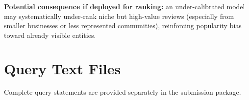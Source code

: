 \documentclass[11pt,a4paper]{article}
\begin{document}
\textbf{Potential consequence if deployed for ranking:} an under-calibrated model may systematically under-rank niche but high-value reviews (especially from smaller businesses or less represented communities), reinforcing popularity bias toward already visible entities.

\section{Query Text Files}
Complete query statements are provided separately in the submission package.
\end{document}
